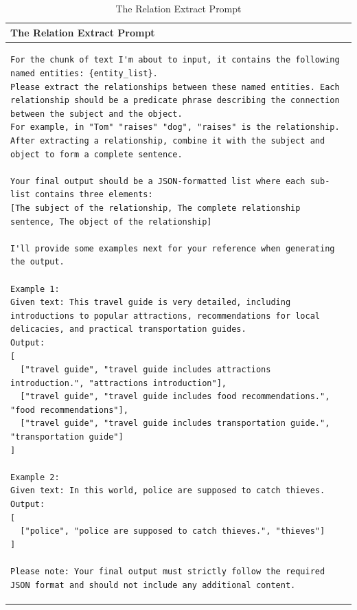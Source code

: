 \begin{table}[h]
\centering
\begin{tabular}{p{\textwidth}}
\toprule
\textbf{The Relation Extract Prompt} \\ 
\midrule
\begin{lstlisting}[basicstyle=\ttfamily\small, frame=single, breaklines=true, breakindent=0pt]
For the chunk of text I'm about to input, it contains the following named entities: {entity_list}.
Please extract the relationships between these named entities. Each relationship should be a predicate phrase describing the connection between the subject and the object.
For example, in "Tom" "raises" "dog", "raises" is the relationship. After extracting a relationship, combine it with the subject and object to form a complete sentence.

Your final output should be a JSON-formatted list where each sub-list contains three elements:
[The subject of the relationship, The complete relationship sentence, The object of the relationship]

I'll provide some examples next for your reference when generating the output.

Example 1:  
Given text: This travel guide is very detailed, including introductions to popular attractions, recommendations for local delicacies, and practical transportation guides.  
Output:  
[
  ["travel guide", "travel guide includes attractions introduction.", "attractions introduction"],
  ["travel guide", "travel guide includes food recommendations.", "food recommendations"],
  ["travel guide", "travel guide includes transportation guide.", "transportation guide"]
]

Example 2:  
Given text: In this world, police are supposed to catch thieves.  
Output:  
[
  ["police", "police are supposed to catch thieves.", "thieves"]
]

Please note: Your final output must strictly follow the required JSON format and should not include any additional content.
\end{lstlisting} \\
\bottomrule
\end{tabular}
\caption{The Relation Extract Prompt}
\label{tab:relation-extract-prompt}
\end{table}